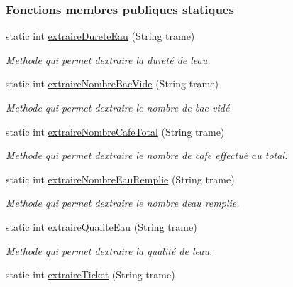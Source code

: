 \subsubsection*{Fonctions membres publiques statiques}
\begin{DoxyCompactItemize}
\item 
static int \hyperlink{classcom_1_1example_1_1ekawa_1_1_protocole_a3d092fccea3a5bf3a92810dbe90603b0}{extraire\+Durete\+Eau} (String trame)
\begin{DoxyCompactList}\small\item\em Methode qui permet d\textquotesingle{}extraire la dureté de l\textquotesingle{}eau. \end{DoxyCompactList}\item 
static int \hyperlink{classcom_1_1example_1_1ekawa_1_1_protocole_a7cdbcbd7aa67f4b0cebb963725b0c67e}{extraire\+Nombre\+Bac\+Vide} (String trame)
\begin{DoxyCompactList}\small\item\em Methode qui permet d\textquotesingle{}extraire le nombre de bac vidé \end{DoxyCompactList}\item 
static int \hyperlink{classcom_1_1example_1_1ekawa_1_1_protocole_ad76b79c64aaa9abed9a1219f3f28cb9a}{extraire\+Nombre\+Cafe\+Total} (String trame)
\begin{DoxyCompactList}\small\item\em Methode qui permet d\textquotesingle{}extraire le nombre de cafe effectué au total. \end{DoxyCompactList}\item 
static int \hyperlink{classcom_1_1example_1_1ekawa_1_1_protocole_ae4aa9859ca0f359284c931e31732477f}{extraire\+Nombre\+Eau\+Remplie} (String trame)
\begin{DoxyCompactList}\small\item\em Methode qui permet d\textquotesingle{}extraire le nombre d\textquotesingle{}eau remplie. \end{DoxyCompactList}\item 
static int \hyperlink{classcom_1_1example_1_1ekawa_1_1_protocole_a8f7c96aaa3fad76354e1cb4665c85e57}{extraire\+Qualite\+Eau} (String trame)
\begin{DoxyCompactList}\small\item\em Methode qui permet d\textquotesingle{}extraire la qualité de l\textquotesingle{}eau. \end{DoxyCompactList}\item 
static int \hyperlink{classcom_1_1example_1_1ekawa_1_1_protocole_a4997ef198a7f87d76c2f68849caae8d7}{extraire\+Ticket} (String trame)

\end{DoxyCompactItemize}
